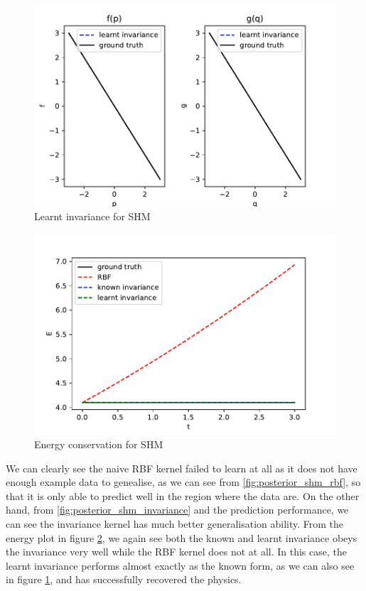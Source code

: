 \documentclass{statsmsc}
\begin{document}
\begin{figure}[H] 
  \includegraphics[width=\linewidth]{../codes/figures/shm_learnt.pdf}
  \centering
  \caption{Learnt invariance for SHM}
  \label{fig:shm_learnt}
\end{figure}

\begin{figure}[H] 
  \includegraphics[width=\linewidth]{../codes/figures/shm_energy.pdf}
  \centering
  \caption{Energy conservation for SHM}
  \label{fig:shm_energy}
\end{figure}

We can clearly see the naive RBF kernel failed to learn at all as it does not have enough example data to genealise, as we can see from \ref{fig:posterior_shm_rbf}, so that it is only able to predict well in the region where the data are. 
On the other hand, from \ref{fig:posterior_shm_invariance} and the prediction performance, we can see the invariance kernel has much better generalisation ability.
From the energy plot in figure \ref{fig:shm_energy}, we again see both the known and learnt invariance obeys the invariance very well while the RBF kernel does not at all.
In this case, the learnt invariance performs almost exactly as the known form, as we can also see in figure \ref{fig:shm_learnt}, and has successfully recovered the physics. 
\end{document}
